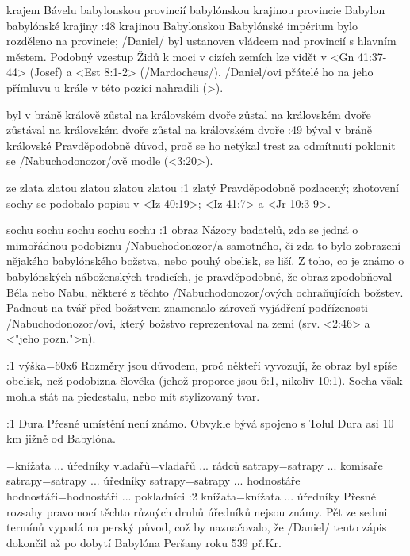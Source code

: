     {krajem Bávelu} %
    {babylonskou provincií}  %
    {babylónskou krajinou} %
    {provincie Babylon}  %
    {babylónské krajiny}  %
:48 {krajinou Babylonskou} Babylónské impérium bylo rozděleno na provincie;  \x/Daniel/ byl ustanoven vládcem nad provincií s hlavním městem. Podobný vzestup Židů k moci v cizích zemích lze vidět v <Gn 41:37-44> (Josef) a <Est 8:1-2> (\x/Mardocheus/). \x/Daniel/ovi přátelé ho na jeho přímluvu u krále v této pozici nahradili (>).

    {byl v bráně králově} %
    {zůstal na královském dvoře}  %
    {zůstal na královském dvoře} %
    {zůstával na královském dvoře}  %
    {zůstal na královském dvoře}  %
:49 {býval v bráně královské} Pravděpodobně důvod, proč se ho netýkal trest za odmítnutí poklonit se \x/Nabuchodonozor/ově modle (<3:20>).

    {ze zlata} %
    {zlatou}  %
    {zlatou} %
    {zlatou}  %
    {zlatou}  %
:1 {zlatý}  Pravděpodobně pozlacený; zhotovení sochy se podobalo popisu v <Iz 40:19>; <Iz 41:7> a  <Jr 10:3-9>.

    {sochu} %
    {sochu}  %
    {sochu} %
    {sochu}  %
    {sochu}  %
:1 {obraz} Názory badatelů, zda se jedná o mimořádnou podobiznu  \x/Nabuchodonozor/a samotného, či zda to bylo zobrazení nějakého babylónského božstva, nebo pouhý obelisk, se liší. Z toho, co je známo o babylónských náboženských tradicích, je pravděpodobné, že obraz zpodobňoval Béla nebo Nabu, některé z těchto \x/Nabuchodonozor/ových ochraňujících božstev. Padnout na tvář před božstvem znamenalo zároveň vyjádření podřízenosti \x/Nabuchodonozor/ovi, který božstvo reprezentoval na zemi (srv. <2:46> a <"jeho pozn.">n). 

:1 {výška}={60x6} Rozměry jsou důvodem, proč někteří vyvozují, že obraz byl spíše obelisk, než podobizna člověka (jehož proporce jsou 6:1, nikoliv 10:1). Socha však mohla stát na piedestalu, nebo mít stylizovaný tvar.

:1 {Dura} Přesné umístění není známo. Obvykle bývá spojeno s Tolul Dura asi 10 km jižně od Babylóna.

={knížata ... úředníky}  %
    {vladařů}={vladařů ... rádců} %
    {satrapy}={satrapy ... komisaře}  %
    {satrapy}={satrapy ... úředníky} %
    {satrapy}={satrapy ... hodnostáře}  %
    {hodnostáři}={hodnostáři ... pokladníci}  %
:2 {knížata}={knížata ... úředníky} Přesné rozsahy pravomocí těchto  různých druhů úředníků nejsou známy. Pět ze sedmi termínů vypadá na perský původ, což by naznačovalo, že \x/Daniel/ tento zápis dokončil až po dobytí Babylóna Peršany  roku 539 př.Kr.

